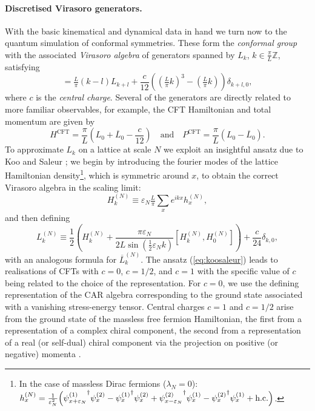 \documentclass[12pt]{article}
\newcommand{\1}{\mathds{1}}
\newcommand{\vep}{\varepsilon}
\begin{document}
\paragraph*{Discretised Virasoro generators.} With the basic kinematical and dynamical data in hand we turn now to the quantum simulation of conformal symmetries. These form the \emph{conformal group} with the associated \emph{Virasoro algebra} of generators spanned by  $L_k$, $k\in\frac{\pi}{L}\mathbb{Z}$, satisfying 
\begin{equation}
	[L_k,L_l] = \tfrac{L}{\pi}(k-l)L_{k+l} + \frac{c}{12}((\tfrac{L}{\pi}k)^3-(\tfrac{L}{\pi}k))\delta_{k+l,0},
\end{equation}
where $c$ is the \emph{central charge}. Several of the generators are directly related to more familiar observables, for example, the CFT Hamiltonian and total momentum are given by
\begin{equation}
	H^{\text{CFT}} = \frac{\pi}{L}\left(L_0+\overline{L}_0 -\frac{c}{12}\right) \quad \text{and}\quad P^{\text{CFT}} = \frac{\pi}{L}\left(L_0-\overline{L}_0\right).
\end{equation}
To approximate $L_k$ on a lattice at scale $N$ we exploit an insightful ansatz due to Koo and Saleur \cite{kooRepresentationsVirasoroAlgebra1994b}; we begin by introducing the fourier modes of the lattice Hamiltonian density\footnote{In the case of massless Dirac fermions ($\lambda_{N}=0$): $h_x^{(N)} = \frac{1}{\vep_N^2}\Big({\psi^{(1)}_{x+\varepsilon_{N}}}^\dagger{\psi^{(2)}_{x}} - {\psi^{(1)}_{x}}^\dagger{\psi^{(2)}_{x}} + {\psi^{(2)}_{x-\varepsilon_{N}}}^\dagger{\psi^{(1)}_{x}} - {\psi^{(2)}_{x}}^\dagger{\psi^{(1)}_{x}} + \textup{h.c.}\Big)$.}, which is symmetric around $x$, to obtain the correct Virasoro algebra in the scaling limit:
\begin{equation}
	H_k^{(N)} \equiv \vep_N \tfrac{L}{\pi} \sum_{x} e^{ikx} h_x^{(N)},
\end{equation} 
and then defining 
\begin{equation}\label{eq:koosaleur}
	L_k^{(N)}  \equiv \frac{1}{2}\left(H_k^{(N)}+ \frac{\pi \vep_N}{2 L \sin(\frac{1}{2}\vep_N k)}[H_k^{(N)},H_0^{(N)}]\right)+\frac{c}{24}\delta_{k,0},
\end{equation}
with an analogous formula for $\overline{L}_k^{(N)}$. The ansatz (\ref{eq:koosaleur}) leads to realisations of CFTs with $c=0$, $c=1/2$, and $c=1$ with the specific value of $c$ being related to the choice of the representation. For $c=0$, we use the defining representation of the CAR algebra corresponding to the ground state associated with a vanishing stress-energy tensor. Central charges $c=1$ and $c=1/2$ arise from the ground state of the massless free fermion Hamiltonian, the first from a representation of a complex chiral component, the second from a representation of a real (or self-dual) chiral component via the projection on positive (or negative) momenta \cite{osborneConformal2021}.
\end{document}
